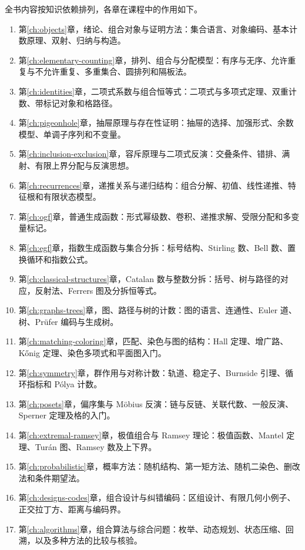 全书内容按知识依赖排列，各章在课程中的作用如下。
\begin{enumerate}
  \item 第\ref{ch:objects}章，绪论、组合对象与证明方法：集合语言、对象编码、基本计数原理、双射、归纳与构造。
  \item 第\ref{ch:elementary-counting}章，排列、组合与分配模型：有序与无序、允许重复与不允许重复、多重集合、圆排列和隔板法。
  \item 第\ref{ch:identities}章，二项式系数与组合恒等式：二项式与多项式定理、双重计数、带标记对象和格路径。
  \item 第\ref{ch:pigeonhole}章，抽屉原理与存在性证明：抽屉的选择、加强形式、余数模型、单调子序列和不变量。
  \item 第\ref{ch:inclusion-exclusion}章，容斥原理与二项式反演：交叠条件、错排、满射、有限上界分配与反演思想。
  \item 第\ref{ch:recurrences}章，递推关系与递归结构：组合分解、初值、线性递推、特征根和有限状态模型。
  \item 第\ref{ch:ogf}章，普通生成函数：形式幂级数、卷积、递推求解、受限分配和多变量标记。
  \item 第\ref{ch:egf}章，指数生成函数与集合分拆：标号结构、Stirling 数、Bell 数、置换循环和指数公式。
  \item 第\ref{ch:classical-structures}章，Catalan 数与整数分拆：括号、树与路径的对应，反射法、Ferrers 图及分拆恒等式。
  \item 第\ref{ch:graphs-trees}章，图、路径与树的计数：图的语言、连通性、Euler 道、树、Pr\"ufer 编码与生成树。
  \item 第\ref{ch:matching-coloring}章，匹配、染色与图的结构：Hall 定理、增广路、K\H{o}nig 定理、染色多项式和平面图入门。
  \item 第\ref{ch:symmetry}章，群作用与对称计数：轨道、稳定子、Burnside 引理、循环指标和 P\'olya 计数。
  \item 第\ref{ch:posets}章，偏序集与 M\"obius 反演：链与反链、关联代数、一般反演、Sperner 定理及格的入门。
  \item 第\ref{ch:extremal-ramsey}章，极值组合与 Ramsey 理论：极值函数、Mantel 定理、Tur\'an 图、Ramsey 数及上下界。
  \item 第\ref{ch:probabilistic}章，概率方法：随机结构、第一矩方法、随机二染色、删改法和条件期望法。
  \item 第\ref{ch:designs-codes}章，组合设计与纠错编码：区组设计、有限几何小例子、正交拉丁方、距离与编码界。
  \item 第\ref{ch:algorithms}章，组合算法与综合问题：枚举、动态规划、状态压缩、回溯，以及多种方法的比较与核验。
\end{enumerate}

